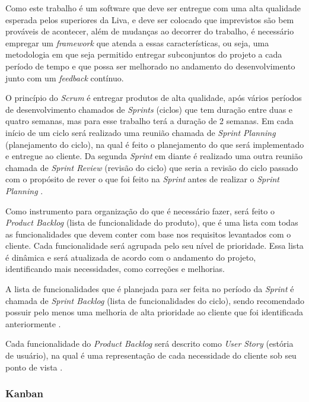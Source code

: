 Como este trabalho é um software que deve ser entregue com uma alta qualidade esperada pelos superiores da Liva, e deve ser colocado que imprevistos são bem prováveis de acontecer, além de mudanças ao decorrer do trabalho, é necessário empregar um \textit{framework} que atenda a essas características, ou seja, uma metodologia em que seja permitido entregar subconjuntos do projeto a cada período de tempo e que possa ser melhorado no andamento do desenvolvimento junto com um \textit{feedback} contínuo.

O princípio do \textit{Scrum} é entregar produtos de alta qualidade, após vários períodos de desenvolvimento chamados de \textit{Sprints} (ciclos) que tem duração entre duas e quatro semanas, mas para esse trabalho terá a duração de 2 semanas. Em cada início de um ciclo será realizado uma reunião chamada de \textit{Sprint Planning} (planejamento do ciclo), na qual é feito o planejamento do que será implementado e entregue ao cliente. Da segunda \textit{Sprint} em diante é realizado uma outra reunião chamada de \textit{Sprint Review} (revisão do ciclo) que seria a revisão do ciclo passado com o propósito de rever o que foi feito na \textit{Sprint} antes de realizar o \textit{Sprint Planning} \cite{ijcf94}.

Como instrumento para organização do que é necessário fazer, será feito o \textit{Product Backlog} (lista de funcionalidade do produto), que é uma lista com todas as funcionalidades que devem conter com base nos requisitos levantados com o cliente. Cada funcionalidade será agrupada pelo seu nível de prioridade. Essa lista é dinâmica e será atualizada de acordo com o andamento do projeto, identificando mais necessidades, como correções e melhorias.

A lista de funcionalidades que é planejada para ser feita no período da \textit{Sprint} é chamada de \textit{Sprint Backlog} (lista de funcionalidades do ciclo), sendo recomendado possuir pelo menos uma melhoria de alta prioridade ao cliente que foi identificada anteriormente \cite{ijcf94}.

Cada funcionalidade do \textit{Product Backlog} será descrito como \textit{User Story} (estória de usuário), na qual é uma representação de cada necessidade do cliente sob seu ponto de vista \cite{knowledge21:2019}.

\subsubsection{Kanban}
\label{section_kanban}

